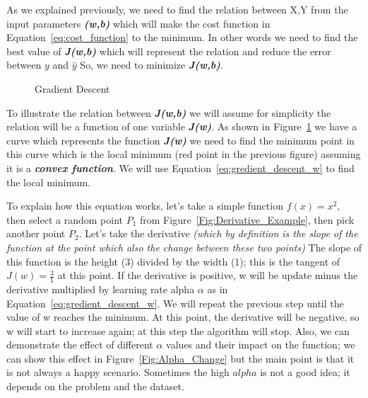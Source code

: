 As we explained previously, we need to find the relation between X,Y from the input parameters \textbf{\textit{(w,b)}} which will make the cost function in Equation~\eqref{eq:cost_function} to the minimum. In other words we need to find the best value of \textbf{\textit{J(w,b)}} which will represent the relation and reduce the error between $y$ and $\widehat{y}$ So, we need to minimize \textbf{\textit{J(w,b)}}.%
%
\begin{figure}[t]
\begin{center}

\caption{Gradient Descent}\label{Fig:gradient_decent_surf}
\end{center}
\end{figure}%
%
To illustrate the relation between \textbf{\textit{J(w,b)}} we will assume for simplicity the relation will be a function of one variable \textbf{\textit{J(w)}}. As shown in Figure~\ref{Fig:gradient_decent_surf} we have a curve which represents the function \textbf{\textit{J(w)}} we need to find the minimum point in this curve which is the local minimum (red point in the previous figure) assuming it is a \textbf{\textit{convex function}}. We will use Equation~\eqref{eq:gredient_descent_w} to find the local minimum.

To explain how this equation works, let's take a simple function $f(x) = x^2$, then select a random point $P_1$ from Figure~\ref{Fig:Derivative_Example}, then pick another point $P_2$. Let's take the derivative \textit{(which by definition is the slope of the function at the point which also the change between these two points)} The slope of this function is the height (3) divided by the width (1); this is the tangent of $J(w)=\frac{3}{1}$ at this point. If the derivative is positive, w will be update minus the derivative multiplied by learning rate alpha $\alpha$ as in Equation~\eqref{eq:gredient_descent_w}. We will repeat the previous step until the value of w reaches the minimum. At this point, the derivative will be negative, so w will start to increase again; at this step the algorithm will stop. Also, we can demonstrate the effect of different $\alpha$ values and their impact on the function; we can show this effect in Figure~\ref{Fig:Alpha_Change} but the main point is that it is not always a happy scenario. Sometimes the high $alpha$ is not a good idea; it depends on the problem and the dataset.

